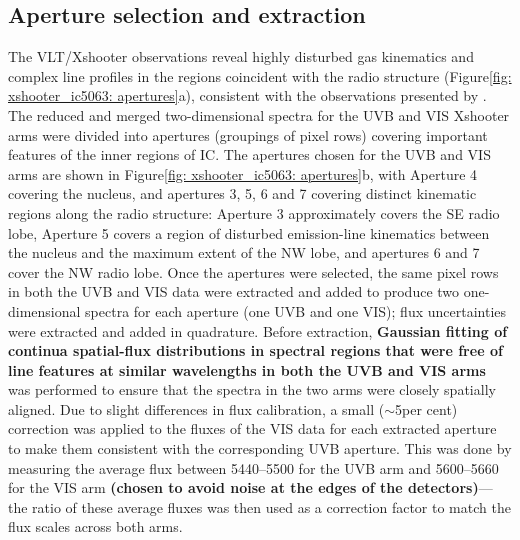 \subsection{Aperture selection and extraction}
\label{section: xshooter_ic_5063: observations_and_data_reduction: apertures}

The VLT/Xshooter observations reveal highly disturbed gas kinematics and complex line profiles in the regions coincident with the radio structure (Figure\;\ref{fig: xshooter_ic5063: apertures}a), consistent with the observations presented by \citet{Morganti2007}. The reduced and merged two-dimensional spectra for the UVB and VIS Xshooter arms were divided into apertures (groupings of pixel rows) covering important features of the inner regions of IC. The apertures chosen for the UVB and VIS arms are shown in Figure\;\ref{fig: xshooter_ic5063: apertures}b, with Aperture 4 covering the nucleus, and apertures 3, 5, 6 and 7 covering distinct kinematic regions along the radio structure: Aperture 3 approximately covers the SE radio lobe, Aperture 5 covers a region of disturbed emission-line kinematics between the nucleus and the maximum extent of the NW lobe, and apertures 6 and 7 cover the NW radio lobe. Once the apertures were selected, the same pixel rows in both the UVB and VIS data were extracted and added to produce two one-dimensional spectra for each aperture (one UVB and one VIS); flux uncertainties were extracted and added in quadrature. Before extraction, \textbf{Gaussian fitting of continua spatial-flux distributions in spectral regions that were free of line features at similar wavelengths in both the UVB and VIS arms} was performed to ensure that the spectra in the two arms were closely spatially aligned. Due to slight differences in flux calibration, a small ($\sim$5\;per cent) correction was applied to the fluxes of the VIS data for each extracted aperture to make them consistent with the corresponding UVB aperture. This was done by measuring the average flux between 5440--5500\;{\AA} for the UVB arm and 5600--5660\;{\AA} for the VIS arm \textbf{(chosen to avoid noise at the edges of the detectors)}--- the ratio of these average fluxes was then used as a correction factor to match the flux scales across both arms. 

